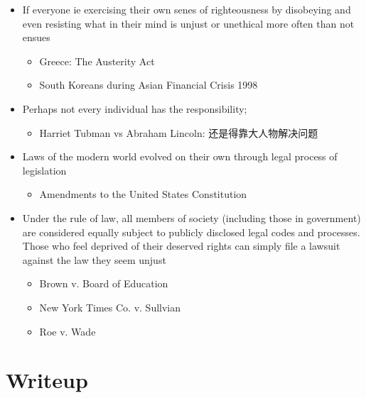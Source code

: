 \documentclass{article}
\begin{document}
\begin{itemize}
\begin{itemize}
          \item If everyone ie exercising their own senes of righteousness by
          disobeying and even resisting what in their mind is unjust or
          unethical  more often than not ensues
          \begin{itemize}
            \item Greece: The Austerity Act
            \item South Koreans during Asian Financial Crisis 1998
          \end{itemize}

          \item Perhaps not every individual has the responsibility;
          \begin{itemize}
            \item Harriet Tubman vs Abraham Lincoln: 还是得靠大人物解决问题
          \end{itemize}

          \item Laws of the modern world evolved on their own through
          legal process of legislation
          \begin{itemize}
            \item Amendments to the United States Constitution
          \end{itemize}

          \item Under the rule of law, all members of society
          (including those in government) are considered equally subject to
          publicly disclosed legal codes and processes. Those who feel deprived
          of their deserved rights can simply file a lawsuit against the law
          they seem unjust
          \begin{itemize}
            \item Brown v. Board of Education
            \item New York Times Co. v. Sullvian
            \item Roe v. Wade
          \end{itemize}
        \end{itemize}
      \end{itemize}

  \section{Writeup}
\end{document}
